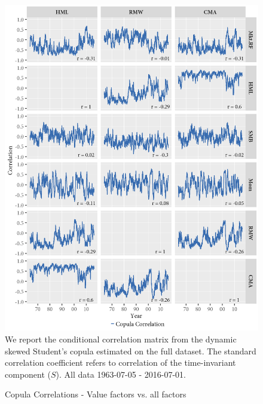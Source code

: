 \begin{figure}[H]
  \caption{Copula Correlations - Value factors vs. all factors}
  \label{diag:rolling_copula}
  \toprule
  \centering
  \begin{minipage}{\textwidth}
  \includegraphics[scale=1]{graphics/rolling_copula_ghskt.png}  
  \bottomrule
  \vspace{3mm}
  \footnotesize
  We report the conditional correlation matrix from the dynamic skewed Student's copula estimated on the full dataset. The standard correlation coefficient refers to correlation of the time-invariant component ($S$). All data 1963-07-05 - 2016-07-01.
  \end{minipage}
\end{figure}

